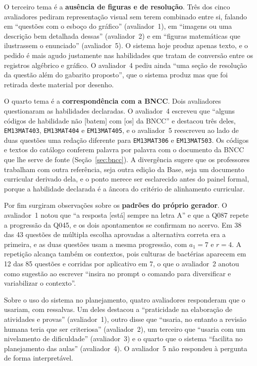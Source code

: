 O terceiro tema é a \textbf{ausência de figuras e de resolução}. Três dos cinco avaliadores pediram
representação visual sem terem combinado entre si, falando em ``questões com o esboço do gráfico''
(avaliador~1), em ``imagens ou uma descrição bem detalhada dessas'' (avaliador~2) e em ``figuras
matemáticas que ilustrassem o enunciado'' (avaliador~5). O sistema hoje produz apenas texto, e o
pedido é mais agudo justamente nas habilidades que tratam de conversão entre os registros algébrico
e gráfico. O avaliador~4 pediu ainda ``uma seção de resolução da questão além do gabarito proposto'',
que o sistema produz mas que foi retirada deste material por desenho.

O quarto tema é a \textbf{correspondência com a BNCC}. Dois avaliadores questionaram as habilidades
declaradas. O avaliador~4 escreveu que ``alguns códigos de habilidade não [batem] com [os] da BNCC''
e destacou três deles, \texttt{EM13MAT403}, \texttt{EM13MAT404} e \texttt{EM13MAT405}, e o
avaliador~5 reescreveu ao lado de duas questões uma redação diferente para \texttt{EM13MAT306} e
\texttt{EM13MAT503}. Os códigos e textos do catálogo conferem palavra por palavra com o documento da
BNCC que lhe serve de fonte (Seção~\ref{sec:bncc}). A divergência sugere que os professores trabalham
com outra referência, seja outra edição da Base, seja um documento curricular derivado dela, e o
ponto merece ser esclarecido antes do painel formal, porque a habilidade declarada é a âncora do
critério de alinhamento curricular.

Por fim surgiram observações sobre os \textbf{padrões do próprio gerador}. O avaliador~1 notou que
``a resposta [está] sempre na letra A'' e que a Q087 repete a progressão da Q045, e os dois
apontamentos se confirmam no acervo. Em 38 das 43 questões de múltipla escolha aprovadas a
alternativa correta era a primeira, e as duas questões usam a mesma progressão, com $a_1 = 7$ e
$r = 4$. A repetição alcança também os contextos, pois culturas de bactérias aparecem em 12 das 85
questões e corridas por aplicativo em 7, o que o avaliador~2 anotou como sugestão ao escrever
``insira no prompt o comando para diversificar e variabilizar o contexto''.

Sobre o uso do sistema no planejamento, quatro avaliadores responderam que o usariam, com
ressalvas. Um deles destacou a ``praticidade na elaboração de atividades e provas'' (avaliador~1),
outro disse que ``usaria, no entanto a revisão humana teria que ser criteriosa'' (avaliador~2), um
terceiro que ``usaria com um nivelamento de dificuldade'' (avaliador~3) e o quarto que o sistema
``facilita no planejamento das aulas'' (avaliador~4). O avaliador~5 não respondeu à pergunta de
forma interpretável.


